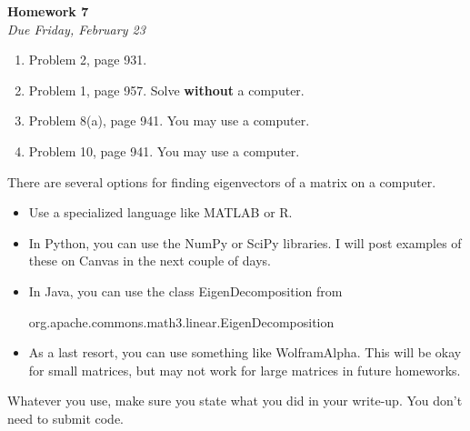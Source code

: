 \documentclass[oneside,12pt]{memoir}
\begin{document}
\begin{center}
\textbf{\large Homework 7} \\
\emph{Due Friday, February 23}
\end{center}

\begin{enumerate}[leftmargin=*]

\item Problem 2, page 931.
\item Problem 1, page 957. Solve \textbf{without} a computer.
\item Problem 8(a), page 941. You may use a computer.
\item Problem 10, page 941. You may use a computer.

\end{enumerate}

There are several options for finding eigenvectors of a matrix on a computer.

\begin{itemize}
\item Use a specialized language like MATLAB or R.
\item In Python, you can use the NumPy or SciPy libraries. I will post examples of these on Canvas in the next couple of days.
\item In Java, you can use the class EigenDecomposition from
\begin{center}
org.apache.commons.math3.linear.EigenDecomposition
\end{center}
\item As a last resort, you can use something like WolframAlpha. This will be okay for small matrices, but may not work for large matrices in future homeworks.
\end{itemize}
Whatever you use, make sure you state what you did in your write-up. You don't need to submit code.
\end{document}
